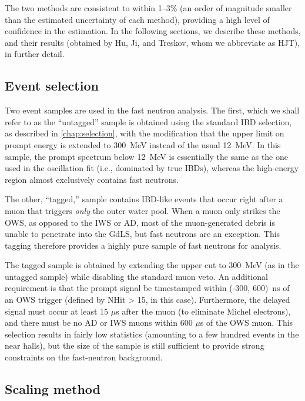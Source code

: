 \documentclass[../thesis.tex]{subfiles}
\begin{document}
The two methods are consistent to within 1--3\% (an order of magnitude smaller
than the estimated uncertainty of each method), providing a high level of
confidence in the estimation. In the following sections, we describe these
methods, and their results (obtained by Hu, Ji, and Treskov, whom we abbreviate
as HJT), in further detail.

\subsection{Event selection}
\label{sec:fastn_sel}

Two event samples are used in the fast neutron analysis. The first, which we
shall refer to as the ``untagged'' sample is obtained using the standard IBD
selection, as described in \autoref{chap:selection}, with the modification that
the upper limit on prompt energy is extended to 300~MeV instead of the usual
12~MeV. In this sample, the prompt spectrum below 12~MeV is essentially the same
as the one used in the oscillation fit (i.e., dominated by true IBDs), whereas
the high-energy region almost exclusively contains fast neutrons.

The other, ``tagged,'' sample contains IBD-like events that occur right after a
muon that triggers \emph{only} the outer water pool. When a muon only strikes
the OWS, as opposed to the IWS or AD, most of the muon-generated debris is
unable to penetrate into the GdLS, but fast neutrons are an exception. This
tagging therefore provides a highly pure sample of fast neutrons for analysis.

The tagged sample is obtained by extending the upper cut to 300~MeV (as in the
untagged sample) while disabling the standard muon veto. An additional
requirement is that the prompt signal be timestamped within (-300, 600)~ns of an
OWS trigger (defined by NHit > 15, in this case). Furthermore, the delayed
signal must occur at least 15 $\mu$s after the muon (to eliminate Michel
electrons), and there must be no AD or IWS muons within 600 $\mu$s of the OWS
muon. This selection results in fairly low statistics (amounting to a few
hundred events in the near halls), but the size of the sample is still
sufficient to provide strong constraints on the fast-neutron background.

\subsection{Scaling method}
\label{sec:fastn_scaling}
\end{document}
